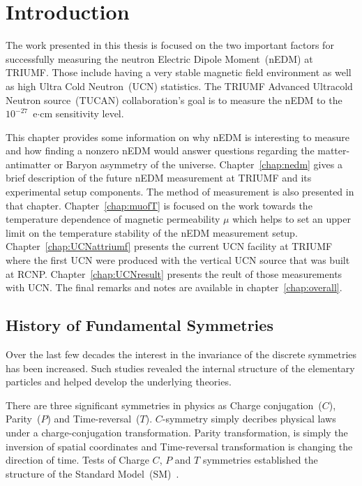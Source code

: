 \chapter{Introduction\label{chap:intro}}
\renewcommand{\thepage}{\arabic{page}}%
\setcounter{page}{1}%



The work presented in this thesis is focused on the two important
factors for successfully measuring the neutron Electric Dipole
Moment~(nEDM) at TRIUMF. Those include having a very stable magnetic
field environment as well as high Ultra Cold Neutron~(UCN)
statistics. The TRIUMF Advanced Ultracold Neutron source~(TUCAN)
collaboration's goal is to measure the nEDM to the
$10^{-27}$~e$\cdot$cm sensitivity level.


This chapter provides some information on why nEDM is interesting to
measure and how finding a nonzero nEDM would answer questions
regarding the matter-antimatter or Baryon asymmetry of the
universe. Chapter~\ref{chap:nedm} gives a brief description of the
future nEDM measurement at TRIUMF and its experimental setup
components. The method of measurement is also presented in that
chapter. Chapter~\ref{chap:muofT} is focused on the work towards the
temperature dependence of magnetic permeability $\mu$ which helps to
set an upper limit on the temperature stability of the nEDM
measurement setup. Chapter~\ref{chap:UCNattriumf} presents the current
UCN facility at TRIUMF where the first UCN were produced with the
vertical UCN source that was built at
RCNP. Chapter~\ref{chap:UCNresult} presents the reult of those
measurements with UCN. The final remarks and notes are available in
chapter~\ref{chap:overall}.



\section{History of Fundamental Symmetries }

Over the last few decades the interest in the invariance of the
discrete symmetries has been increased. Such studies revealed the
internal structure of the elementary particles and helped develop the
underlying theories.

There are three significant symmetries in physics as Charge
conjugation~($C$), Parity~($P$) and Time-reversal~($T$). $C$-symmetry
simply decribes physical laws under a charge-conjugation
transformation. Parity transformation, is simply the inversion of
spatial coordinates and Time-reversal transformation is changing the
direction of time.  Tests of Charge $C$, $P$ and $T$ symmetries
established the structure
of the Standard Model~(SM)~\cite{pospelov2005electric}.

